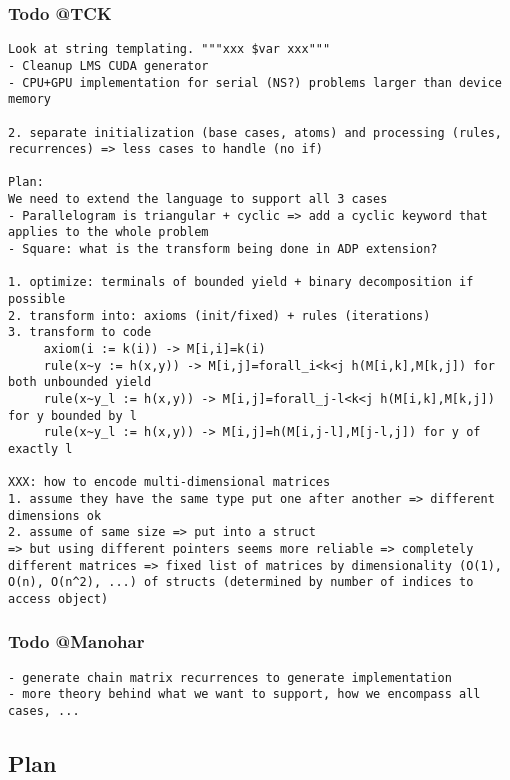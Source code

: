 \documentclass[11pt]{article}
\begin{document}
\subsubsection*{Todo @TCK}
\begin{verbatim}
Look at string templating. """xxx $var xxx"""
- Cleanup LMS CUDA generator
- CPU+GPU implementation for serial (NS?) problems larger than device memory

2. separate initialization (base cases, atoms) and processing (rules, recurrences) => less cases to handle (no if)

Plan:
We need to extend the language to support all 3 cases
- Parallelogram is triangular + cyclic => add a cyclic keyword that applies to the whole problem
- Square: what is the transform being done in ADP extension?

1. optimize: terminals of bounded yield + binary decomposition if possible
2. transform into: axioms (init/fixed) + rules (iterations)
3. transform to code
     axiom(i := k(i)) -> M[i,i]=k(i)
     rule(x~y := h(x,y)) -> M[i,j]=forall_i<k<j h(M[i,k],M[k,j]) for both unbounded yield
     rule(x~y_l := h(x,y)) -> M[i,j]=forall_j-l<k<j h(M[i,k],M[k,j]) for y bounded by l
     rule(x~y_l := h(x,y)) -> M[i,j]=h(M[i,j-l],M[j-l,j]) for y of exactly l

XXX: how to encode multi-dimensional matrices
1. assume they have the same type put one after another => different dimensions ok
2. assume of same size => put into a struct
=> but using different pointers seems more reliable => completely different matrices => fixed list of matrices by dimensionality (O(1), O(n), O(n^2), ...) of structs (determined by number of indices to access object)
\end{verbatim}

\subsubsection*{Todo @Manohar}
\begin{verbatim}
- generate chain matrix recurrences to generate implementation
- more theory behind what we want to support, how we encompass all cases, ...
\end{verbatim}

\subsection*{Plan} \ol
\end{document}
